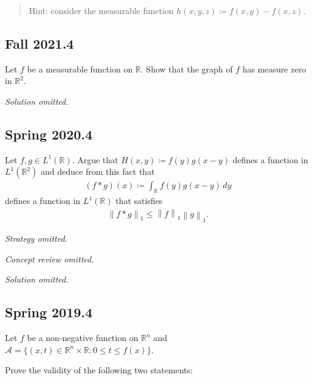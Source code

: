 \begin{quote}
Hint: consider the measurable function
\(h(x,y,z) \coloneqq f(x, y) - f(x, z)\).
\end{quote}

\hypertarget{fall-2021.4}{%
\subsection{Fall 2021.4}\label{fall-2021.4}}

\begin{problem}[?]

Let \(f\) be a measurable function on \(\mathbb{R}\). Show that the
graph of \(f\) has measure zero in \(\mathbb{R}^{2}\).

\end{problem}

\emph{Solution omitted.}

\hypertarget{spring-2020.4}{%
\subsection{Spring 2020.4}\label{spring-2020.4}}

Let \(f, g\in L^1({\mathbb{R}})\). Argue that
\(H(x, y) \coloneqq f(y) g(x-y)\) defines a function in
\(L^1({\mathbb{R}}^2)\) and deduce from this fact that
\begin{align*}
(f\ast g)(x) \coloneqq\int_{\mathbb{R}}f(y) g(x-y) \,dy
\end{align*}
defines a function in \(L^1({\mathbb{R}})\) that satisfies
\begin{align*}
{\left\lVert {f\ast g} \right\rVert}_1 \leq {\left\lVert {f} \right\rVert}_1 {\left\lVert {g} \right\rVert}_1
.\end{align*}

\emph{Strategy omitted.}

\emph{Concept review omitted.}

\emph{Solution omitted.}

\hypertarget{spring-2019.4}{%
\subsection{Spring 2019.4}\label{spring-2019.4}}

Let \(f\) be a non-negative function on \({\mathbb{R}}^n\) and
\(\mathcal A = \{(x, t) ∈ {\mathbb{R}}^n \times {\mathbb{R}}: 0 ≤ t ≤ f (x)\}\).

Prove the validity of the following two statements:

